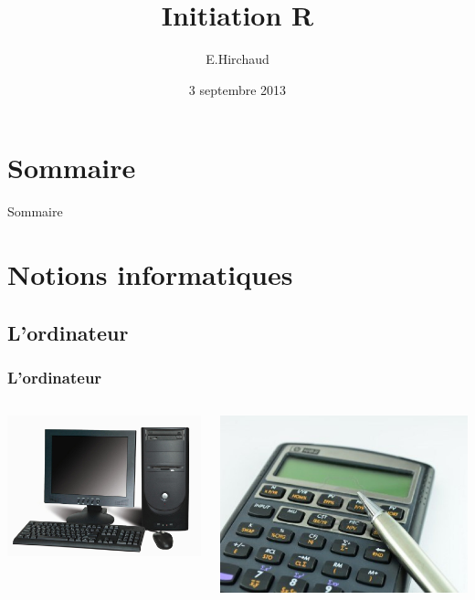 \documentclass{beamer}
\title{Initiation R}
\institute{BiRD}
\date{3 septembre 2013}
\author{E.Hirchaud}
\begin{document}
\begin{frame}
	\titlepage
\end{frame}
	

\section*{Sommaire}
\begin{frame}{Sommaire}
	\small \tableofcontents
\end{frame}

\section{Notions informatiques}
\subsection{L'ordinateur}
\begin{frame}
	\frametitle{L'ordinateur}
	\begin{columns}
		\begin{column}[c]{5cm}
			\includegraphics[scale=0.2]{image/PC.jpg}
		\end{column}
		\begin{column}[c]{5cm}
			\includegraphics[scale=0.15]{image/calculette.jpg}
		\end{column}
	\end{columns}
\end{frame}
\end{document}
